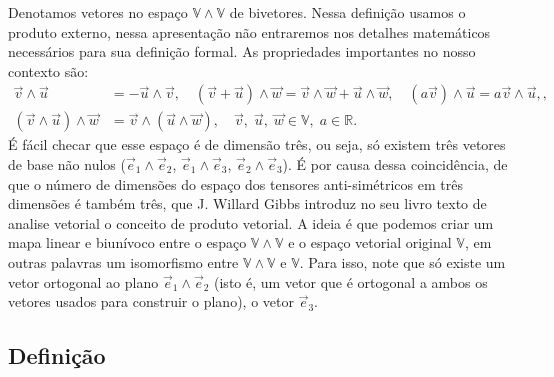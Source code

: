 Denotamos vetores no espaço $\mathbb{V}\wedge\mathbb{V}$ de bivetores. Nessa
definição usamos o produto externo, nessa apresentação não entraremos nos
detalhes matemáticos necessários para sua definição formal. As propriedades
importantes no nosso contexto são:
\begin{equation}
	\begin{split}
		\vec{v}\wedge\vec{u}                           & = - \vec{u}\wedge\vec{v},\quad (\vec{v}+\vec{u})\wedge\vec{w} = \vec{v}\wedge\vec{w}+\vec{u}\wedge\vec{w}, \quad (a\vec{v})\wedge\vec{u} = a\vec{v}\wedge\vec{u},, \\
		\left(\vec{v}\wedge\vec{u}\right)\wedge\vec{w} & = \vec{v}\wedge\left(\vec{u}\wedge\vec{w}\right),\quad \vec{v},\;\vec{u},\;\vec{w}\in\mathbb{V},\;a\in\mathbb{R}.
	\end{split}
\end{equation}
É fácil checar que esse espaço é de dimensão três, ou seja, só existem três
vetores de base não nulos ($\vec{e}_1\wedge \vec{e}_2$, $\vec{e}_1\wedge
	\vec{e}_3$, $\vec{e}_2\wedge \vec{e}_3$). É por causa dessa coincidência, de que
o número de dimensões do espaço dos tensores anti-simétricos em três dimensões é
também três, que J. Willard Gibbs introduz no seu livro texto de analise
vetorial o conceito de produto vetorial. A ideia é que podemos criar um mapa
linear e biunívoco entre o espaço $\mathbb{V}\wedge\mathbb{V}$ e o espaço
vetorial original $\mathbb{V}$, em outras palavras um isomorfismo entre
$\mathbb{V}\wedge\mathbb{V}$ e $\mathbb{V}$. Para isso, note que só existe um
vetor ortogonal ao plano $\vec{e}_1\wedge\vec{e}_2$ (isto é, um vetor que é
ortogonal a ambos os vetores usados para construir o plano), o vetor
$\vec{e}_3$.

\subsection{Definição}

